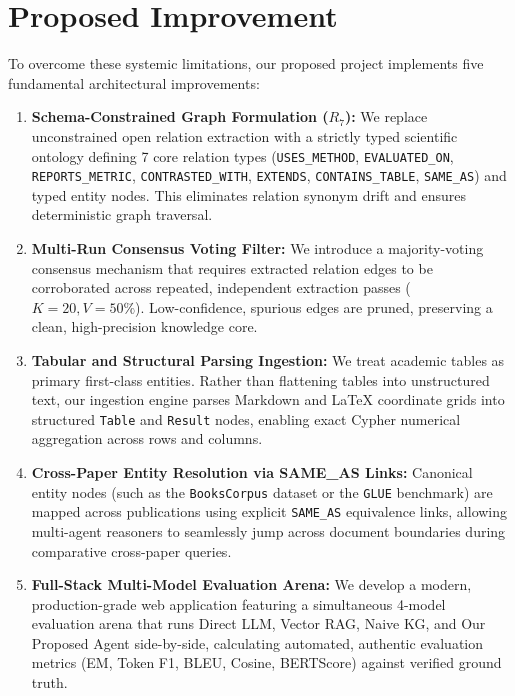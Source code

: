 \documentclass[12pt,a4paper,oneside]{report}
\begin{document}
\section{Proposed Improvement}
To overcome these systemic limitations, our proposed project implements five fundamental architectural improvements:
\begin{enumerate}
    \item \textbf{Schema-Constrained Graph Formulation ($R_7$):} We replace unconstrained open relation extraction with a strictly typed scientific ontology defining 7 core relation types (\texttt{USES\_METHOD}, \texttt{EVALUATED\_ON}, \texttt{REPORTS\_METRIC}, \texttt{CONTRASTED\_WITH}, \texttt{EXTENDS}, \texttt{CONTAINS\_TABLE}, \texttt{SAME\_AS}) and typed entity nodes. This eliminates relation synonym drift and ensures deterministic graph traversal.
    \item \textbf{Multi-Run Consensus Voting Filter:} We introduce a majority-voting consensus mechanism that requires extracted relation edges to be corroborated across repeated, independent extraction passes ($K=20, V=50\%$). Low-confidence, spurious edges are pruned, preserving a clean, high-precision knowledge core.
    \item \textbf{Tabular and Structural Parsing Ingestion:} We treat academic tables as primary first-class entities. Rather than flattening tables into unstructured text, our ingestion engine parses Markdown and LaTeX coordinate grids into structured \texttt{Table} and \texttt{Result} nodes, enabling exact Cypher numerical aggregation across rows and columns.
    \item \textbf{Cross-Paper Entity Resolution via SAME\_AS Links:} Canonical entity nodes (such as the \texttt{BooksCorpus} dataset or the \texttt{GLUE} benchmark) are mapped across publications using explicit \texttt{SAME\_AS} equivalence links, allowing multi-agent reasoners to seamlessly jump across document boundaries during comparative cross-paper queries.
    \item \textbf{Full-Stack Multi-Model Evaluation Arena:} We develop a modern, production-grade web application featuring a simultaneous 4-model evaluation arena that runs Direct LLM, Vector RAG, Naive KG, and Our Proposed Agent side-by-side, calculating automated, authentic evaluation metrics (EM, Token F1, BLEU, Cosine, BERTScore) against verified ground truth.
\end{enumerate}
\end{document}
